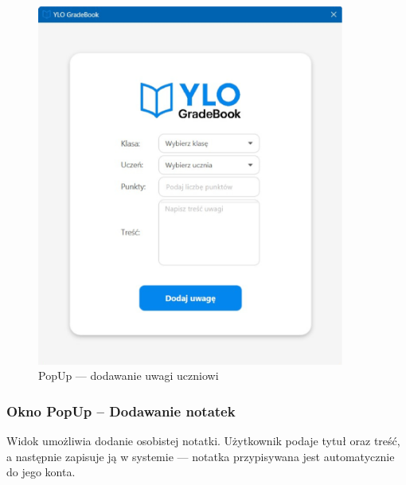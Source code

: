 \begin{figure}[H]
    \centering
    \includegraphics[width=0.9\textwidth]{figures/fig_0018.eps}
    \caption{PopUp — dodawanie uwagi uczniowi}
    \label{fig:popUpNN}
\end{figure}
\newpage
\subsubsection{Okno PopUp – Dodawanie notatek}
Widok umożliwia dodanie osobistej notatki. Użytkownik podaje tytuł oraz treść, a następnie zapisuje ją w systemie — notatka przypisywana jest automatycznie do jego konta.

